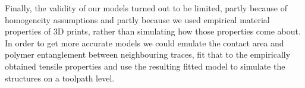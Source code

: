 Finally, the validity of our models turned out to be limited,
partly because of homogeneity assumptions and partly because we used empirical material properties of 3D prints, rather than simulating how those properties come about.
In order to get more accurate models we could emulate the contact area and polymer entanglement between neighbouring traces,
fit that to the empirically obtained tensile properties and use the resulting fitted model to simulate the structures on a toolpath level.
